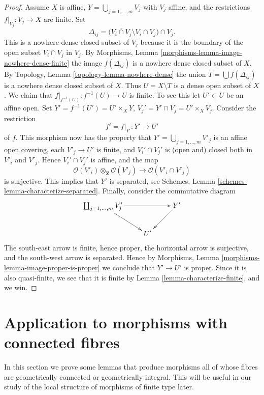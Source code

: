 \begin{proof}
\medskip\noindent
Assume $X$ is affine, $Y = \bigcup_{j = 1, \ldots, m} V_j$ with $V_j$ affine,
and the restrictions $f|_{V_j} : V_j \to X$ are finite.
Set
$$
\Delta_{ij} =
\Big(\overline{V_i \cap V_j} \setminus V_i \cap V_j\Big) \cap V_j.
$$
This is a nowhere dense closed subset of $V_j$ because it is the boundary
of the open subset $V_i \cap V_j$ in $V_j$. By
Morphisms, Lemma \ref{morphisms-lemma-image-nowhere-dense-finite}
the image $f(\Delta_{ij})$ is a nowhere dense closed subset of $X$. By
Topology, Lemma \ref{topology-lemma-nowhere-dense}
the union $T = \bigcup f(\Delta_{ij})$ is a nowhere dense closed
subset of $X$. Thus $U = X \setminus T$ is a dense open subset of $X$.
We claim that $f|_{f^{-1}(U)} : f^{-1}(U) \to U$ is finite.
To see this let $U' \subset U$ be an affine open.
Set $Y' = f^{-1}(U') = U' \times_X Y$,
$V_j' = Y' \cap V_j = U' \times_X V_j$. Consider the restriction
$$
f' = f|_{Y'} : Y' \longrightarrow U'
$$
of $f$. This morphism now has the property that
$Y' = \bigcup_{j = 1, \ldots, m} V'_j$ is an affine open covering,
each $V'_j \to U'$ is finite, and $V_i' \cap V_j'$ is (open and) closed
both in $V'_i$ and $V'_j$. Hence $V_i' \cap V_j'$ is affine, and the map
$$
\mathcal{O}(V'_i) \otimes_{\mathbf{Z}} \mathcal{O}(V'_j)
\longrightarrow
\mathcal{O}(V'_i \cap V'_j)
$$
is surjective. This implies that $Y'$ is separated, see
Schemes, Lemma \ref{schemes-lemma-characterize-separated}.
Finally, consider the commutative diagram
$$
\xymatrix{
\coprod_{j = 1, \ldots, m} V'_j \ar[rd] \ar[rr] & & Y' \ar[ld] \\
& U' &
}
$$
The south-east arrow is finite, hence proper, the horizontal arrow is
surjective, and the south-west arrow is separated. Hence by
Morphisms, Lemma \ref{morphisms-lemma-image-proper-is-proper}
we conclude that $Y' \to U'$ is proper. Since it is also quasi-finite,
we see that it is finite by Lemma \ref{lemma-characterize-finite},
and we win.
\end{proof}











\section{Application to morphisms with connected fibres}
\label{section-application-geometrically-connected}

\noindent
In this section we prove some lemmas that produce morphisms all of
whose fibres are geometrically connected or geometrically integral.
This will be useful in our study of the local structure of morphisms
of finite type later.


